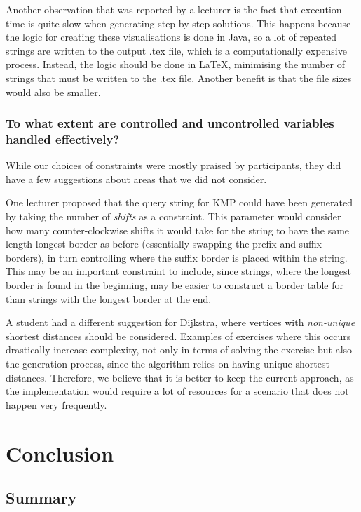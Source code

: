 \documentclass{l4proj}
\begin{document}
Another observation that was reported by a lecturer is the fact that execution time is quite slow when generating step-by-step solutions. This happens because the logic for creating these visualisations is done in Java, so a lot of repeated strings are written to the output .tex file, which is a computationally expensive process. Instead, the logic should be done in LaTeX, minimising the number of strings that must be written to the .tex file. Another benefit is that the file sizes would also be smaller.

\subsection*{To what extent are controlled and uncontrolled variables handled effectively?}

While our choices of constraints were mostly praised by participants, they did have a few suggestions about areas that we did not consider.

One lecturer proposed that the query string for KMP could have been generated by taking the number of \emph{shifts} as a constraint. This parameter would consider how many counter-clockwise shifts it would take for the string to have the same length longest border as before (essentially swapping the prefix and suffix borders), in turn controlling where the suffix border is placed within the string. This may be an important constraint to include, since strings, where the longest border is found in the beginning, may be easier to construct a border table for than strings with the longest border at the end.

A student had a different suggestion for Dijkstra, where vertices with \emph{non-unique} shortest distances should be considered. Examples of exercises where this occurs drastically increase complexity, not only in terms of solving the exercise but also the generation process, since the algorithm relies on having unique shortest distances. Therefore, we believe that it is better to keep the current approach, as the implementation would require a lot of resources for a scenario that does not happen very frequently.

\chapter{Conclusion}    
\label{chap:conc}
\section{Summary}
\end{document}
